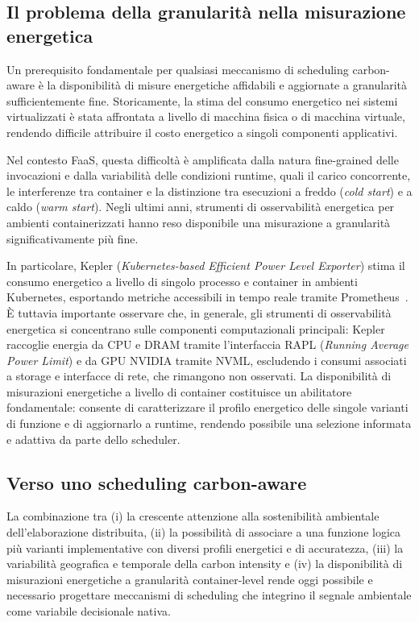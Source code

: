 \subsection{Il problema della granularità nella misurazione energetica}

Un prerequisito fondamentale per qualsiasi meccanismo di scheduling carbon-aware è la
disponibilità di misure energetiche affidabili e aggiornate a granularità
sufficientemente fine.
Storicamente, la stima del consumo energetico nei sistemi virtualizzati è stata
affrontata a livello di macchina fisica o di macchina virtuale, rendendo difficile
attribuire il costo energetico a singoli componenti applicativi.

Nel contesto FaaS, questa difficoltà è amplificata dalla natura fine-grained delle
invocazioni e dalla variabilità delle condizioni runtime, quali il carico concorrente,
le interferenze tra container e la distinzione tra esecuzioni a freddo (\emph{cold start})
e a caldo (\emph{warm start}).
Negli ultimi anni, strumenti di osservabilità energetica per ambienti containerizzati
hanno reso disponibile una misurazione a granularità significativamente più fine.

In particolare, Kepler (\emph{Kubernetes-based Efficient Power Level Exporter}) stima
il consumo energetico a livello di singolo processo e container in ambienti Kubernetes,
esportando metriche accessibili in tempo reale tramite
Prometheus~\cite{Amaral2023_Kepler}.
È tuttavia importante osservare che, in generale, gli strumenti di osservabilità
energetica si concentrano sulle componenti computazionali principali: Kepler raccoglie
energia da CPU e DRAM tramite l'interfaccia RAPL (\emph{Running Average Power Limit})
e da GPU NVIDIA tramite NVML, escludendo i consumi associati a storage e interfacce
di rete, che rimangono non osservati.
La disponibilità di misurazioni energetiche a livello di container costituisce un
abilitatore fondamentale: consente di caratterizzare il profilo energetico delle singole
varianti di funzione e di aggiornarlo a runtime, rendendo possibile una selezione
informata e adattiva da parte dello scheduler.

\subsection{Verso uno scheduling carbon-aware}

La combinazione tra (i) la crescente attenzione alla sostenibilità ambientale
dell'elaborazione distribuita, (ii) la possibilità di associare a una funzione logica più
varianti implementative con diversi profili energetici e di accuratezza, (iii) la
variabilità geografica e temporale della carbon intensity e (iv) la disponibilità di
misurazioni energetiche a granularità container-level rende oggi possibile e necessario
progettare meccanismi di scheduling che integrino il segnale ambientale come variabile
decisionale nativa.

